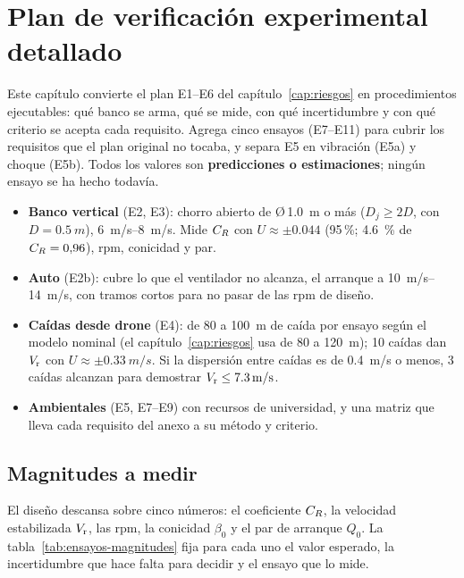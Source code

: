 \chapter{Plan de verificación experimental detallado}\label{cap:ensayos}

Este capítulo convierte el plan E1--E6 del capítulo~\ref{cap:riesgos} en procedimientos
ejecutables: qué banco se arma, qué se mide, con qué incertidumbre y con qué criterio se
acepta cada requisito. Agrega cinco ensayos (E7--E11) para cubrir los requisitos que el
plan original no tocaba, y separa E5 en vibración (E5a) y choque (E5b). Todos los valores son \textbf{predicciones o estimaciones}; ningún
ensayo se ha hecho todavía.

\begin{resultado}
\begin{itemize}[leftmargin=*]
  \item \textbf{Banco vertical} (E2, E3): chorro abierto de Ø\,\SI{1.0}{m} o más
        ($D_j\ge2D$, con $D=\SI{0.5}{m}$), \SIrange{6}{8}{m/s}. Mide $C_{R}$ con
        $U\approx\pm\num{0.044}$ (95\,\%; \SI{4.6}{\percent} de $C_{R}=0{,}96$), rpm, conicidad y par.
  \item \textbf{Auto} (E2b): cubre lo que el ventilador no alcanza, el arranque a
        \SIrange{10}{14}{m/s}, con tramos cortos para no pasar de las rpm de diseño.
  \item \textbf{Caídas desde drone} (E4): de 80 a \SI{100}{m} de caída por ensayo según el
        modelo nominal (el capítulo~\ref{cap:riesgos} usa de 80 a \SI{120}{m});
        10 caídas dan $V_{\mathrm{r}}$ con $U\approx\pm\SI{0.33}{m/s}$. Si la dispersión entre caídas
        es de \SI{0.4}{m/s} o menos, 3 caídas alcanzan para demostrar $V_{\mathrm{r}}\le\SI{7.3}{m/s}$.
  \item \textbf{Ambientales} (E5, E7--E9) con recursos de universidad, y una matriz que
        lleva cada requisito del anexo a su método y criterio.
\end{itemize}
\end{resultado}

\section{Magnitudes a medir}\label{sec:ensayos-magnitudes}
El diseño descansa sobre cinco números: el coeficiente $C_{R}$, la velocidad estabilizada
$V_{\mathrm{r}}$, las rpm, la conicidad $\beta_0$ y el par de arranque $Q_0$. La
tabla~\ref{tab:ensayos-magnitudes} fija para cada uno el valor esperado, la incertidumbre
que hace falta para decidir y el ensayo que lo mide.

